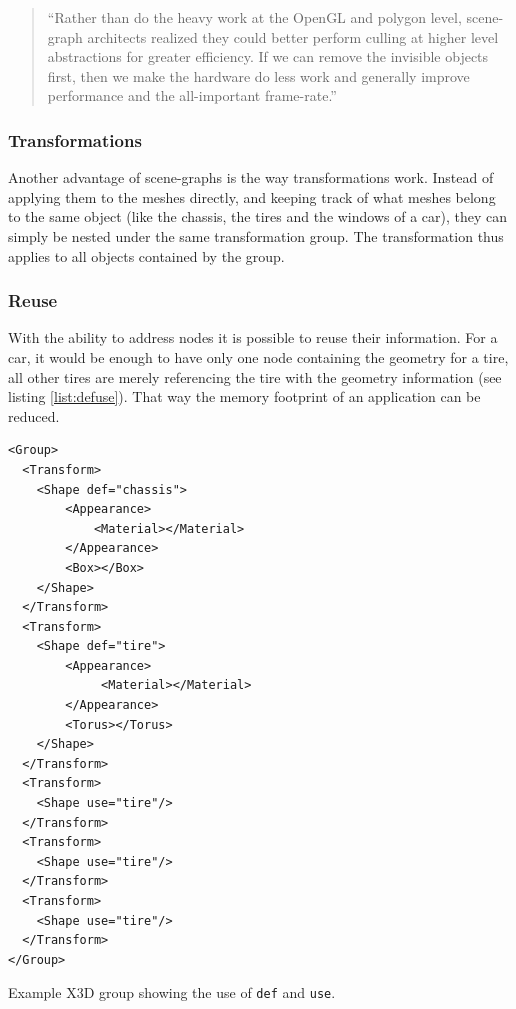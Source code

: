 \begin{quote}
  ``Rather than do the heavy work at the \gls{OpenGL} and polygon level,
  scene-graph architects realized they could better perform culling at
  higher level abstractions for greater efficiency. If we can remove the
  invisible objects first, then we make the hardware do less work and
  generally improve performance and the all-important frame-rate.'' \cite{realityprime}
\end{quote}

\subsubsection{Transformations}\label{transformations}

Another advantage of scene-graphs is the way transformations work. Instead of applying
them to the meshes directly, and keeping track of what meshes belong to
the same object (like the chassis, the tires and the windows of a
car), they can simply be nested under the same transformation group. The
transformation thus applies to all objects contained by the group.

\subsubsection{Reuse}\label{reuse}

With the ability to address nodes it is possible to reuse their
information. For a car, it would be enough to have only one node
containing the geometry for a tire, all other tires are merely referencing
the tire with the geometry information (see listing \ref{list:defuse}).
That way the memory footprint of an application can be reduced.

\begin{listing}
  \begin{verbatim}
<Group>
  <Transform>
    <Shape def="chassis">
        <Appearance>
            <Material></Material>
        </Appearance>
        <Box></Box>
    </Shape>
  </Transform>
  <Transform>
    <Shape def="tire">
        <Appearance>
             <Material></Material>
        </Appearance>
        <Torus></Torus>
    </Shape>
  </Transform>
  <Transform>
    <Shape use="tire"/>
  </Transform>
  <Transform>
    <Shape use="tire"/>
  </Transform>
  <Transform>
    <Shape use="tire"/>
  </Transform>
</Group>
  \end{verbatim}
  \caption{Example \gls{X3D} group showing the use of \texttt{def} and \texttt{use}.}
  \label{list:defuse}
\end{listing}


